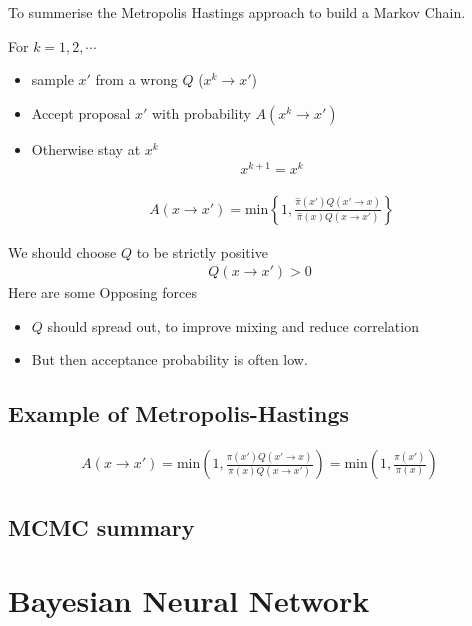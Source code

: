 \documentclass[11pt, oneside, reqno]{amsart}
\numberwithin{equation}{section}
\theoremstyle{plain}%
\theoremstyle{definition}
\theoremstyle{remark}
\begin{document}
To summerise the Metropolis Hastings approach to build a Markov Chain.

For $k=1,2,\cdots$
\begin{itemize}
	\item sample $x'$ from a {\color{red}wrong} $Q$ ($x^k\to x'$)
	\item Accept proposal $x'$ with probability $A(x^k\to x')$
	\item Otherwise stay at $x^k$
	\begin{align*}
		x^{k+1}=x^k
	\end{align*}

\begin{align*}
	A(x\to x')=\text{min}\left\{1,\frac{\hat{\pi}(x')Q(x'\to x)}{\hat{\pi}(x)Q(x\to x')}\right\}
\end{align*}
\end{itemize}
We should choose $Q$ to be strictly positive 
\begin{align*}
	Q(x\to x')>0
\end{align*}
Here are some {\color{red}Opposing forces}
\begin{itemize}
	\item $Q$ should spread out, to improve mixing and reduce correlation
	\item But then acceptance probability is often low.
\end{itemize}
\subsection{Example of Metropolis-Hastings}

\begin{align*}
	A(x\to x')=\text{min}\left(1,\frac{\pi(x')Q(x'\to x)}{\pi(x)Q(x\to x')}\right)
	=\text{min}\left(1,\frac{\pi(x')}{\pi(x)}\right)
\end{align*}

\subsection{MCMC summary}
\section{Bayesian Neural Network}
 
\end{document}
